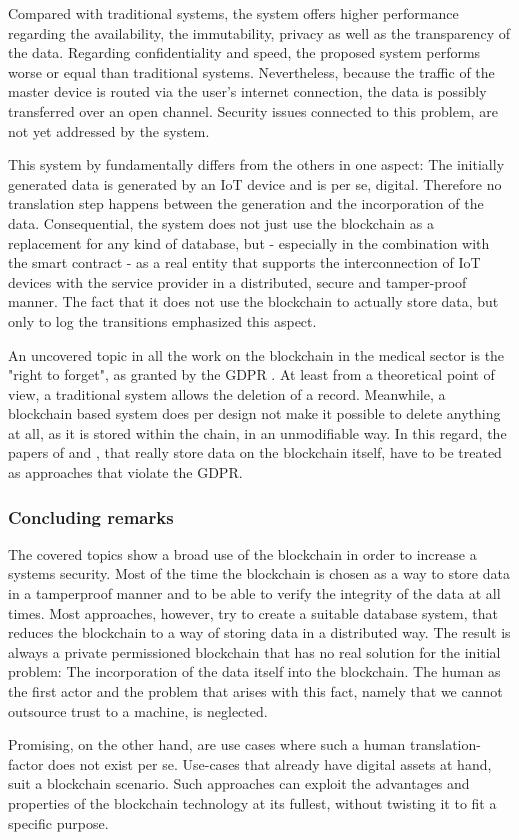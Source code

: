 Compared with traditional systems, the system offers higher performance regarding the availability, the immutability, privacy as well as the transparency of the data. Regarding confidentiality and speed, the proposed system performs worse or equal than traditional systems. \cite{Baccarini2018}
Nevertheless, because the traffic of the master device is routed via the user's internet connection, the data is possibly transferred over an open channel. Security issues connected to this problem, are not yet addressed by the system. \cite{Baccarini2018}

This system by \cite{Baccarini2018} fundamentally differs from the others in one aspect: The initially generated data is generated by an IoT device and is per se, digital. Therefore no translation step happens between the generation and the incorporation of the data.
Consequential, the system does not just use the blockchain as a replacement for any kind of database, but - especially in the combination with the smart contract - as a real entity that supports the interconnection of IoT devices with the service provider in a distributed, secure and tamper-proof manner. The fact that it does not use the blockchain to actually store data, but only to log the transitions emphasized this aspect.

An uncovered topic in all the work on the blockchain in the medical sector is the "right to forget", as granted by the GDPR \cite{EuropeanCommission2017}. At least from a theoretical point of view, a traditional system allows the deletion of a record. Meanwhile, a blockchain based system does per design not make it possible to delete anything at all, as it is stored within the chain, in an unmodifiable way. In this regard, the papers of \cite{Cao2019} and \cite{Azaria2016}, that really store data on the blockchain itself, have to be treated as approaches that violate the GDPR.

\subsubsection{Concluding remarks}
The covered topics show a broad use of the blockchain in order to increase a systems security. Most of the time the blockchain is chosen as a way to store data in a tamperproof manner and to be able to verify the integrity of the data at all times.
Most approaches, however, try to create a suitable database system, that reduces the blockchain to a way of storing data in a distributed way. The result is always a private permissioned blockchain that has no real solution for the initial problem: The incorporation of the data itself into the blockchain. The human as the first actor and the problem that arises with this fact, namely that we cannot outsource trust to a machine, is neglected.

Promising, on the other hand, are use cases where such a human translation-factor does not exist per se. Use-cases that already have digital assets at hand, suit a blockchain scenario. Such approaches can exploit the advantages and properties of the blockchain technology at its fullest, without twisting it to fit a specific purpose.
